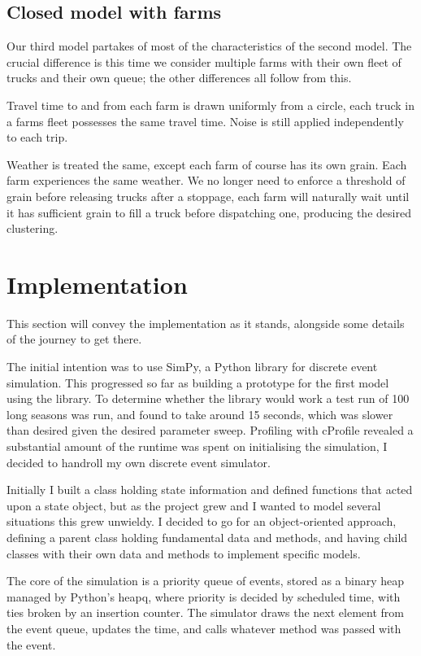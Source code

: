 \documentclass[a4paper, 10.5pt, oneside]{report}
\begin{document}
\section{Closed model with farms}
Our third model partakes of most of the characteristics of the second model. The crucial difference is this
time we consider multiple farms with their own fleet of trucks and their own queue; the other differences
all follow from this.

Travel time to and from each farm is drawn uniformly from a circle, each truck in a farms fleet possesses the
same travel time. Noise is still applied independently to each trip.

Weather is treated the same, except each farm of course has its own grain. Each farm experiences the same weather.
We no longer need to enforce a threshold of grain before releasing trucks after a stoppage, each farm will
naturally wait until it has sufficient grain to fill a truck before dispatching one, producing the desired clustering.



\chapter{Implementation}
This section will convey the implementation as it stands, alongside some details of the journey to get there.

The initial intention was to use SimPy, a Python library for discrete event simulation. This progressed so far as
building a prototype for the first model using the library. To determine whether the library would work a test run
of 100 long seasons was run, and found to take around 15 seconds, which was slower than desired given the
desired parameter sweep. Profiling with
cProfile revealed a substantial amount of the runtime was spent on initialising the simulation, I decided to handroll
my own discrete event simulator.

Initially I built a class holding state information and defined functions that acted upon a state object, but as the
project grew and I wanted to model several situations this grew unwieldy. I decided to go for an object-oriented approach,
defining a parent class holding fundamental data and methods, and having child classes with their own data and methods to
implement specific models.

The core of the simulation is a priority queue of events, stored as a binary heap managed by Python's heapq, where priority is
decided by scheduled time, with ties broken by an insertion counter. The simulator draws the next element from the event queue, updates
the time, and calls whatever method was passed with the event.
\end{document}
